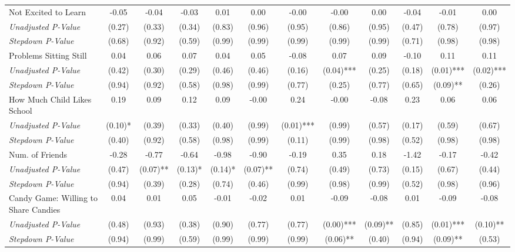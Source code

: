 \begin{tabular}{l c c c c c c c c c c c}
Not Excited to Learn & -0.05 & -0.04 & -0.03 & 0.01 & 0.00 & -0.00 & -0.00 & 0.00 & -0.04 & -0.01 & 0.00 \\
\quad \textit{Unadjusted P-Value} & (0.27) & (0.33) & (0.34) & (0.83) & (0.96) & (0.95) & (0.86) & (0.95) & (0.47) & (0.78) & (0.97) \\
\quad \textit{Stepdown P-Value} & (0.68) & (0.92) & (0.59) & (0.99) & (0.99) & (0.99) & (0.99) & (0.99) & (0.71) & (0.98) & (0.98) \\
Problems Sitting Still & 0.04 & 0.06 & 0.07 & 0.04 & 0.05 & -0.08 & 0.07 & 0.09 & -0.10 & 0.11 & 0.11 \\
\quad \textit{Unadjusted P-Value} & (0.42) & (0.30) & (0.29) & (0.46) & (0.46) & (0.16) & (0.04)*** & (0.25) & (0.18) & (0.01)*** & (0.02)*** \\
\quad \textit{Stepdown P-Value} & (0.94) & (0.92) & (0.58) & (0.98) & (0.99) & (0.77) & (0.25) & (0.77) & (0.65) & (0.09)** & (0.26) \\
How Much Child Likes School & 0.19 & 0.09 & 0.12 & 0.09 & -0.00 & 0.24 & -0.00 & -0.08 & 0.23 & 0.06 & 0.06 \\
\quad \textit{Unadjusted P-Value} & (0.10)* & (0.39) & (0.33) & (0.40) & (0.99) & (0.01)*** & (0.99) & (0.57) & (0.17) & (0.59) & (0.67) \\
\quad \textit{Stepdown P-Value} & (0.40) & (0.92) & (0.58) & (0.98) & (0.99) & (0.11) & (0.99) & (0.98) & (0.52) & (0.98) & (0.98) \\
Num. of Friends & -0.28 & -0.77 & -0.64 & -0.98 & -0.90 & -0.19 & 0.35 & 0.18 & -1.42 & -0.17 & -0.42 \\
\quad \textit{Unadjusted P-Value} & (0.47) & (0.07)** & (0.13)* & (0.14)* & (0.07)** & (0.74) & (0.49) & (0.73) & (0.15) & (0.67) & (0.44) \\
\quad \textit{Stepdown P-Value} & (0.94) & (0.39) & (0.28) & (0.74) & (0.46) & (0.99) & (0.98) & (0.99) & (0.52) & (0.98) & (0.96) \\
Candy Game: Willing to Share Candies & 0.04 & 0.01 & 0.05 & -0.01 & -0.02 & 0.01 & -0.09 & -0.08 & 0.01 & -0.09 & -0.08 \\
\quad \textit{Unadjusted P-Value} & (0.48) & (0.93) & (0.38) & (0.90) & (0.77) & (0.77) & (0.00)*** & (0.09)** & (0.85) & (0.01)*** & (0.10)** \\
\quad \textit{Stepdown P-Value} & (0.94) & (0.99) & (0.59) & (0.99) & (0.99) & (0.99) & (0.06)** & (0.40) & (0.94) & (0.09)** & (0.53) \\
\bottomrule
\end{tabular}
